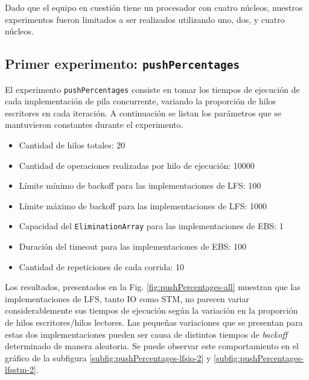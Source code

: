 Dado que el equipo en cuestión tiene un procesador con cuatro núcleos, nuestros experimentos fueron limitados a ser realizados utilizando uno, dos, y cuatro núcleos.

\subsection{Primer experimento: \texttt{pushPercentages}}\label{subsec:pushPercentages}
El experimento \texttt{pushPercentages} consiste en tomar los tiempos de ejecución de cada implementación de pila concurrente, variando la proporción de hilos escritores en cada iteración.
A continuación se listan los parámetros que se mantuvieron constantes durante el experimento.

\begin{itemize}
    \item Cantidad de hilos totales: 20
    \item Cantidad de operaciones realizadas por hilo de ejecución: 10000
    \item Límite mínimo de backoff para las implementaciones de LFS: 100
    \item Límite máximo de backoff para las implementaciones de LFS: 1000
    \item Capacidad del \texttt{EliminationArray} para las implementaciones de EBS: 1
    \item Duración del timeout para las implementaciones de EBS: 100
    \item Cantidad de repeticiones de cada corrida: 10
\end{itemize}

Los resultados, presentados en la Fig. \ref{fig:pushPercentages-all} muestran que las implementaciones de LFS, tanto IO como STM, no parecen variar considerablemente sus tiempos de ejecución según la variación en la proporción de hilos escritores/hilos lectores.
Las pequeñas variaciones que se presentan para estas dos implementaciones pueden ser causa de distintos tiempos de \emph{backoff} determinado de manera aleatoria. Se puede observar este comportamiento en el gráfico de la subfigura \ref{subfig:pushPercentages-lfsio-2} y \ref{subfig:pushPercentages-lfsstm-2}.

